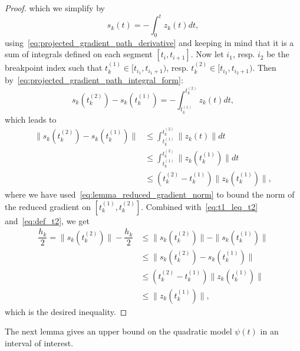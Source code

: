 \begin{proof}
	which we simplify by
	\begin{equation}\label{eq:projected_gradient_path_integral_form}
		s_k(t) = -\int_{0}^{t} z_k(t)dt,
	\end{equation}
	using~\eqref{eq:projected_gradient_path_derivative} and keeping in mind that it is a sum of integrals defined on each segment $[t_i,t_{i+1}]$. 
	Now let $i_1$, resp. $i_2$ be the breakpoint index such that $t_k^{(1)} \in [t_{i_1},t_{i_1+1})$, resp. $t_k^{(2)} \in [t_{i_2},t_{i_2+1})$. Then by~\eqref{eq:projected_gradient_path_integral_form}:
	\begin{equation*}
		s_k(t_k^{(2)}) - s_k(t_k^{(1)}) = -\int_{t_k^{(1)}}^{t_k^{(2)}} z_k(t)dt, 
	\end{equation*}
	which leads to
	\begin{equation*}
		\begin{split}
			\|s_k(t_k^{(2)}) - s_k(t_k^{(1)})\| & \le \int_{t_k^{(1)}}^{t_k^{(2)}} \|z_k(t)\|dt \\
			& \le \int_{t_k^{(1)}}^{t_k^{(2)}} \|z_k(t_k^{(1)})\|dt \\
			& \le (t_k^{(2)}-t_k^{(1)}) \|z_k(t_k^{(1)})\|,
		\end{split}
	\end{equation*}
	where we have used~\eqref{eq:lemma_reduced_gradient_norm} to bound the norm of the reduced gradient on $[t_k^{(1)},t_k^{(2)}]$.
	Combined with~\eqref{eq:t1_leq_t2} and~\eqref{eq:def_t2}, we get
	\begin{equation*}
		\begin{split}
			\dfrac{h_k}{2} = \|s_k(t_k^{(2)})\| - \dfrac{h_k}{2} &\le  \|s_k(t_k^{(2)})\| - \|s_k(t_k^{(1)})\| \\ 
			& \le \|s_k(t_k^{(2)}) - s_k(t_k^{(1)})\| \\
			& \le 	(t_k^{(2)}-t_k^{(1)}) \|z_k(t_k^{(1)})\| \\
			& \le  \|z_k(t_k^{(1)})\|,
		\end{split}
	\end{equation*}
	which is the desired inequality.
\end{proof}

The next lemma gives an upper bound on the quadratic model $\psi(t)$ in an interval of interest.

